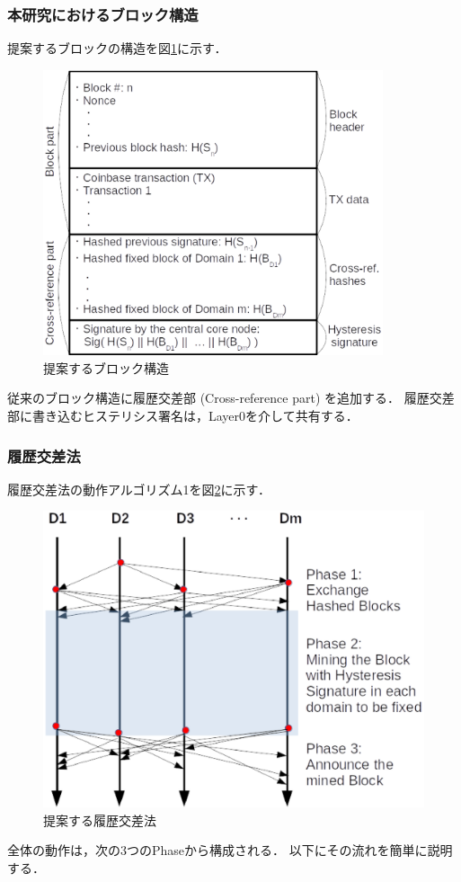 \documentclass[a4paper,12pt]{jsarticle}
\begin{document}
\subsubsection{本研究におけるブロック構造}
提案するブロックの構造を図\ref{fig:block}に示す．
%
\begin{figure}[H]%
  \begin{center}
    \includegraphics[width=100mm]{pht/block_structure.eps}
  \end{center}
  \caption{提案するブロック構造}
  \label{fig:block}
\end{figure}
%
従来のブロック構造に履歴交差部 (Cross-reference part) を追加する．
履歴交差部に書き込むヒステリシス署名は，Layer0を介して共有する．

\subsubsection{履歴交差法}
履歴交差法の動作アルゴリズム1を図\ref{fig:cross-ref}に示す．
%
\begin{figure}[H]%
  \begin{center}
    \includegraphics[width=120mm]{pht/time_sequence-algorithm1.eps}
  \end{center}
  \caption{提案する履歴交差法}
  \label{fig:cross-ref}
\end{figure}
%
全体の動作は，次の3つのPhaseから構成される．
以下にその流れを簡単に説明する．
\end{document}
